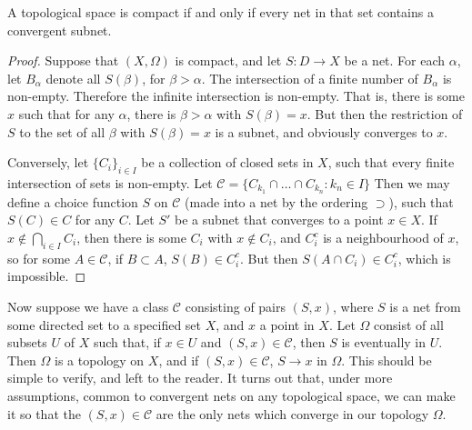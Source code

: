 \begin{theorem}
    A topological space is compact if and only if every net in that set contains a convergent subnet.
\end{theorem}
\begin{proof}
    Suppose that $(X,\Omega)$ is compact, and let $S: D \to X$ be a net. For each $\alpha$, let $B_\alpha$ denote all $S(\beta)$, for $\beta > \alpha$. The intersection of a finite number of $B_\alpha$ is non-empty. Therefore the infinite intersection is non-empty. That is, there is some $x$ such that for any $\alpha$, there is $\beta > \alpha$ with $S(\beta) = x$. But then the restriction of $S$ to the set of all $\beta$ with $S(\beta) = x$ is a subnet, and obviously converges to $x$.

    Conversely, let $\{ C_i \}_{i \in I}$ be a collection of closed sets in $X$, such that every finite intersection of sets is non-empty. Let $\mathcal{C} = \{ C_{k_1} \cap \dots \cap C_{k_n} : k_n \in I \}$ Then we may define a choice function $S$ on $\mathcal{C}$ (made into a net by the ordering $\supset$), such that $S(C) \in C$ for any $C$. Let $S'$ be a subnet that converges to a point $x \in X$. If $x \not \in \bigcap_{i \in I} C_i$, then there is some $C_i$ with $x \not \in C_i$, and $C_i^c$ is a neighbourhood of $x$, so for some $A \in \mathcal{C}$, if $B \subset A$, $S(B) \in C_i^c$. But then $S(A \cap C_i) \in C_i^c$, which is impossible.
\end{proof}

Now suppose we have a class $\mathcal{C}$ consisting of pairs $(S,x)$, where $S$ is a net from some directed set to a specified set $X$, and $x$ a point in $X$. Let $\Omega$ consist of all subsets $U$ of $X$ such that, if $x \in U$ and $(S,x) \in \mathcal{C}$, then $S$ is eventually in $U$. Then $\Omega$ is a topology on $X$, and if $(S,x) \in \mathcal{C}$, $S \to x$ in $\Omega$. This should be simple to verify, and left to the reader. It turns out that, under more assumptions, common to convergent nets on any topological space, we can make it so that the $(S,x) \in \mathcal{C}$ are the only nets which converge in our topology $\Omega$.

